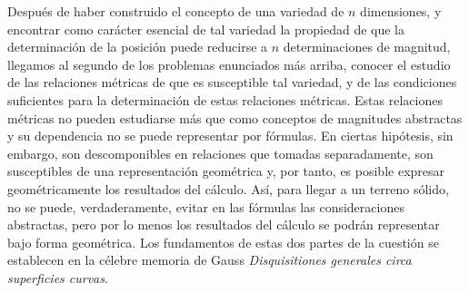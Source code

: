\documentclass[a4paper, 12pt]{article}
\begin{document}
Después de haber construido el concepto de una variedad de $n$ dimensiones, y encontrar como carácter esencial de tal variedad la propiedad de que la determinación de la posición puede reducirse a $n$ determinaciones de magnitud, llegamos al segundo de los problemas enunciados más arriba, conocer el estudio de las relaciones métricas de que es susceptible tal variedad, y de las condiciones suficientes para la determinación de estas relaciones métricas. Estas relaciones métricas no pueden estudiarse más que como conceptos de magnitudes abstractas y su dependencia no
se puede representar por fórmulas. En ciertas hipótesis, sin embargo, son descomponibles en relaciones que tomadas separadamente, son susceptibles de una representación geométrica y, por tanto, es posible expresar geométricamente los resultados del cálculo. Así, para llegar a un terreno sólido, no se puede, verdaderamente, evitar en las fórmulas las consideraciones abstractas, pero por lo menos los resultados del cálculo se podrán representar bajo forma geométrica. Los fundamentos de estas dos partes de la cuestión se establecen en la célebre memoria de Gauss
\textit{Disquisitiones generales circa superficies curvas}.

\bigskip
\end{document}
